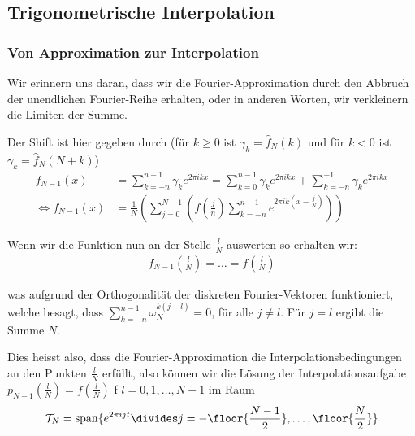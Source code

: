 
\newsection
\subsection{Trigonometrische Interpolation}
\subsubsection{Von Approximation zur Interpolation}
Wir erinnern uns daran, dass wir die Fourier-Approximation durch den Abbruch der unendlichen Fourier-Reihe erhalten, oder in anderen Worten, wir verkleinern die Limiten der Summe.


Der Shift ist hier gegeben durch (für $k \geq 0$ ist $\gamma_k = \hat{f}_N(k)$ und für $k < 0$ ist $\gamma_k = \hat{f}_N(N + k)$)
\begin{align*}
    f_{N - 1}(x)                 & = \sum_{k = -n}^{n - 1} \gamma_k e^{2 \pi ikx} = \sum_{k = 0}^{n - 1} \gamma_k e^{2\pi ikx} + \sum_{k = -n}^{-1} \gamma_k e^{2\pi ikx} \\
    \Leftrightarrow f_{N - 1}(x) & = \frac{1}{N} \left( \sum_{j = 0}^{N - 1} \left( f\left( \frac{j}{n} \right)
        \sum_{k = -n}^{n - 1} e^{2\pi ik \left( x - \frac{j}{N} \right)} \right) \right)
\end{align*}

\vspace{-1pc}

Wenn wir die Funktion nun an der Stelle $\frac{l}{N}$ auswerten so erhalten wir:
\rmvspace
\begin{align*}
    f_{N - 1}\left( \frac{l}{N} \right) = \ldots = f\left( \frac{l}{N} \right)
\end{align*}

\vspace{-1.8pc}
was aufgrund der Orthogonalität der diskreten Fourier-Vektoren funktioniert, welche besagt, dass $\displaystyle \sum_{k = -n}^{n - 1} \omega_N^{k(j - l)} = 0$, für alle $j \neq l$.
Für $j = l$ ergibt die Summe $N$.

Dies heisst also, dass die Fourier-Approximation die Interpolationsbedingungen an den Punkten $\frac{l}{N}$ erfüllt,
also können wir die Lösung der Interpolationsaufgabe $p_{N - 1} \left( \frac{l}{N} \right) = f\left( \frac{l}{N} \right)$ f $l = 0, 1, \ldots, N - 1$ im Raum
\rmvspace
\begin{align*}
    \mathcal{T}_N = \text{span}\{ e^{2\pi ijt} \divides j = - \floor{\frac{N - 1}{2}}, \ldots, \floor{\frac{N}{2}} \}
\end{align*}

